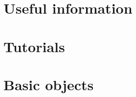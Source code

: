 
\chapter{Useful information}















\chapter{Tutorials}













\chapter{Basic objects}

